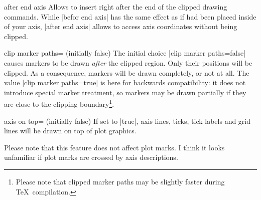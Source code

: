 \begin{pgfplotscodekey}{after end axis}
Allows to insert  right after the end of the clipped drawing commands. While |befor end axis| has the same effect as if  had been placed inside of your axis, |after end axis| allows to access axis coordinates without being clipped.
\begin{codeexample}[]
\end{codeexample}
\end{pgfplotscodekey}

\begin{pgfplotskey}{clip marker paths= (initially false)}
	The initial choice |clip marker paths=false| causes markers to be drawn \emph{after} the clipped region. Only their positions will be clipped. As a consequence, markers will be drawn completely, or not at all. The value |clip marker paths=true| is here for backwards compatibility: it does not introduce special marker treatment, so markers may be drawn partially if they are close to the clipping boundary\footnote{Please note that clipped marker paths may be slightly faster during \TeX\ compilation.}.
\end{pgfplotskey}

\begin{pgfplotskey}{axis on top= (initially false)}
	If set to |true|, axis lines, ticks, tick labels and grid lines will be drawn on top of plot graphics.
\begin{codeexample}[]
\end{codeexample}

\begin{codeexample}[]
\end{codeexample}
Please note that this feature does not affect plot marks. I think it looks unfamiliar if plot marks are crossed by axis descriptions.
\end{pgfplotskey}

